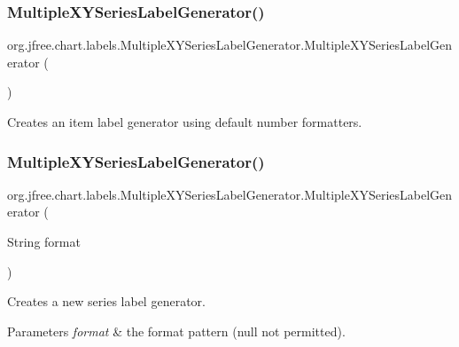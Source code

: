 \subsubsection{\texorpdfstring{Multiple\+X\+Y\+Series\+Label\+Generator()}{MultipleXYSeriesLabelGenerator()}\hspace{0.1cm}{\footnotesize\ttfamily [1/2]}}
{\footnotesize\ttfamily org.\+jfree.\+chart.\+labels.\+Multiple\+X\+Y\+Series\+Label\+Generator.\+Multiple\+X\+Y\+Series\+Label\+Generator (\begin{DoxyParamCaption}{ }\end{DoxyParamCaption})}

Creates an item label generator using default number formatters. \mbox{\label{classorg_1_1jfree_1_1chart_1_1labels_1_1_multiple_x_y_series_label_generator_ab3de4a135b81881ab0186823a31c5b41}} 
\subsubsection{\texorpdfstring{Multiple\+X\+Y\+Series\+Label\+Generator()}{MultipleXYSeriesLabelGenerator()}\hspace{0.1cm}{\footnotesize\ttfamily [2/2]}}
{\footnotesize\ttfamily org.\+jfree.\+chart.\+labels.\+Multiple\+X\+Y\+Series\+Label\+Generator.\+Multiple\+X\+Y\+Series\+Label\+Generator (\begin{DoxyParamCaption}\item[{String}]{format }\end{DoxyParamCaption})}

Creates a new series label generator.


\begin{DoxyParams}{Parameters}
{\em format} & the format pattern ({\ttfamily null} not permitted). \\
\hline
\end{DoxyParams}


